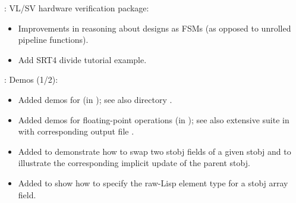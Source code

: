 \begin{frame}

\implibtitle

:
VL/SV hardware verification package:
\begin{itemize}
\item Improvements in reasoning about designs as FSMs
      (as opposed to unrolled pipeline functions).
\item Add SRT4 divide tutorial example.

\end{itemize}

\end{frame}


\begin{frame}

\implibtitle

:
Demos (1/2):
\begin{itemize}
\item Added demos for  (in
      );
      see also directory .
\item Added demos for floating-point operations (in );
      see also extensive suite in 
      with corresponding output file .
\item Added  to demonstrate how
      to swap two stobj fields of a given stobj and to illustrate the
      corresponding implicit update of the parent stobj.
\item Added  to show how to specify
      the raw-Lisp  element type for a stobj array field.
\end{itemize}

\end{frame}


